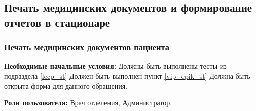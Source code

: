 \subsection{Печать медицинских документов и формирование отчетов в стационаре} \label{rep_st}
\subsubsection{Печать медицинских документов пациента} \label{prn_st}

\textbf{Необходимые начальные условия:} Должны быть выполнены тесты из подраздела \ref{lecp_st} Должен быть выполнен пункт \ref{vip_epik_st} Должна быть открыта форма  для данного обращения.

\textbf{Роли пользователя:} Врач отделения, Администратор.

